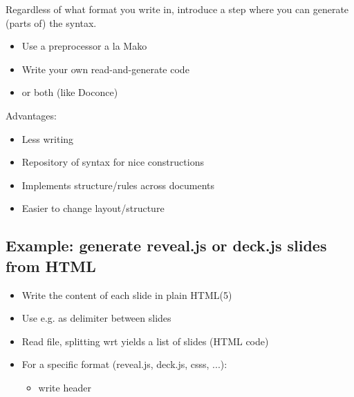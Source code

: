 \documentclass[%
twoside,                 %
draft,                   %
final,                   %
chapterprefix=true,      %
open=right               %
10pt]{book}
\newenvironment{graybox1admon}[1][]{
\begin{graybox1mdframed}[frametitle=#1]
}
{
\end{graybox1mdframed}
}
\begin{document}
\begin{shadedquoteBlue}
\begin{graybox1admon}[]

Regardless of what format you write in, introduce a step where
you can generate (parts of) the syntax.

\begin{itemize}
 \item Use a preprocessor a la Mako

 \item Write your own read-and-generate code

 \item or both (like Doconce)
\end{itemize}

\noindent
Advantages:

\begin{itemize}
 \item Less writing

 \item Repository of syntax for nice constructions

 \item Implements structure/rules across documents

 \item Easier to change layout/structure
\end{itemize}

\noindent
\end{graybox1admon}



\subsection*{Example: generate reveal.js or deck.js slides from HTML}

\begin{itemize}
 \item Write the content of each slide in plain HTML(5)

 \item Use e.g.  as delimiter between slides

 \item Read file, splitting wrt  yields a list of
   slides (HTML code)

 \item For a specific format (reveal.js, deck.js, csss, ...):
\begin{itemize}

    \item write header


\end{itemize}
\end{itemize}
\end{shadedquoteBlue}
\end{document}
